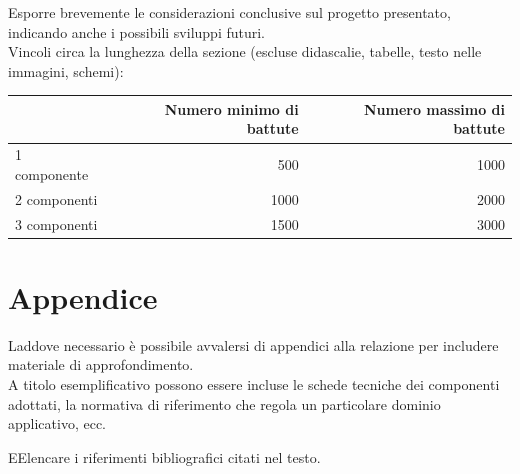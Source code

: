 \documentclass[12pt]{article}
\begin{document}
Esporre brevemente le considerazioni conclusive sul progetto presentato, indicando anche i possibili sviluppi futuri.\\

Vincoli circa la lunghezza della sezione (escluse didascalie, tabelle, testo nelle immagini, schemi):

\vspace{1cm}
\begin{tabular}{l|rr}
 & Numero minimo di battute & Numero massimo di battute \\
 \hline
 1 componente & 500 & 1000 \\
 2 componenti & 1000 & 2000 \\
 3 componenti & 1500 & 3000 \\
 \hline
\end{tabular}

\newpage



\appendix
{}
\section*{Appendice}
Laddove necessario è possibile avvalersi di appendici alla relazione per includere materiale di approfondimento.\\

A titolo esemplificativo possono essere incluse le schede tecniche dei componenti adottati, la normativa di riferimento che regola un particolare dominio applicativo, ecc.


\newpage


\begin{thebibliography}
EElencare i riferimenti bibliografici citati nel testo. 
\end{thebibliography}

\end{document}
